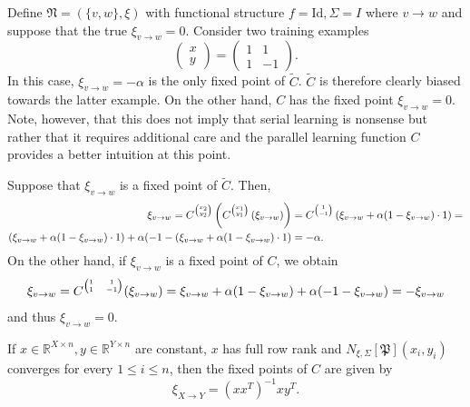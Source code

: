 \documentclass[a4paper,11pt]{report}
\begin{document}
\begin{Ex}\label{ex-learning}
Define $\mathfrak{N}=\left(\{v,w\},\xi\right)$ with functional structure $f=\text{Id},\Sigma=I$ where $v\to w$ and suppose that the true $\xi_{v\to w}=0$. Consider two training examples
\[
\begin{pmatrix}x\\y\end{pmatrix}=\begin{pmatrix}
1&1\\
1&-1
\end{pmatrix}.
\]
In this case, $\xi_{v\to w}=-\alpha$ is the only fixed point of $\tilde{C}$. $\tilde{C}$ is therefore clearly biased towards the latter example. On the other hand, $C$ has the fixed point $\xi_{v\to w}=0$. Note, however, that this does not imply that serial learning is nonsense but rather that it requires additional care and the parallel learning function $C$ provides a better intuition at this point.
\end{Ex}

\begin{Bew}
Suppose that $\xi_{v\to w}$ is a fixed point of $\tilde{C}$. Then,
\begin{align*}
\xi_{v\to w}=C^{\tiny\begin{pmatrix}
x_2\\y_2
\end{pmatrix}}\left(
C^{\tiny\begin{pmatrix}x_1\\y_1\end{pmatrix}}\left(\xi_{v\to w}\right)
\right)
&=
C^{\tiny\begin{pmatrix}1\\-1\end{pmatrix}}\left(
\xi_{v\to w}+\alpha(1-\xi_{v\to w})\cdot 1
\right)
=\\
\left(
\xi_{v\to w}+\alpha(1-\xi_{v\to w})\cdot 1
\right)+
\alpha(-1-\left(
\xi_{v\to w}+\alpha(1-\xi_{v\to w})\cdot 1
\right)&=-\alpha.
\end{align*}
On the other hand, if $\xi_{v\to w}$ is a fixed point of $C$, we obtain
\[
\xi_{v\to w}=C^{\tiny\begin{pmatrix}
1&1\\
1&-1
\end{pmatrix}}(\xi_{v\to w})=
\xi_{v\to w}+\alpha(1-\xi_{v\to w})+\alpha(-1-\xi_{v\to w})=-\xi_{v\to w}
\]
and thus $\xi_{v\to w}=0$.
\end{Bew}

\begin{Pro}\label{pro:linmod}
If $x\in\mathbb{R}^{X\times n},y\in\mathbb{R}^{Y\times n}$ are constant, $x$ has full row rank and $N_{\xi,\Sigma}[\mathfrak{P}](x_i,y_i)$ converges for every $1\le i\le n$, then the fixed points of $C$ are given by
\[
\xi_{X\to Y}=(xx^T)^{-1}xy^T.
\]
\end{Pro}
\end{document}
